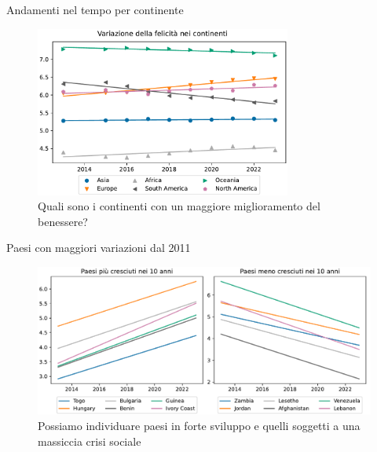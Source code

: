 \documentclass{beamer}
\begin{document}
\begin{frame}{Andamenti nel tempo per continente}
	\begin{figure}
		\centering
		\includegraphics[width=0.75\textwidth]{"./img/5AndamentiContinentali.pdf"}
		\caption{Quali sono i continenti con un maggiore miglioramento del benessere?}
	\end{figure}
\end{frame}
\begin{frame}{Paesi con maggiori variazioni dal 2011}
	\begin{figure}
		\centering
		\includegraphics[width=1\textwidth]{"./img/6MaggioreVariazione.pdf"}
		\caption{Possiamo individuare paesi in forte sviluppo e quelli soggetti a una massiccia crisi sociale}
	\end{figure}
\end{frame}
\end{document}

